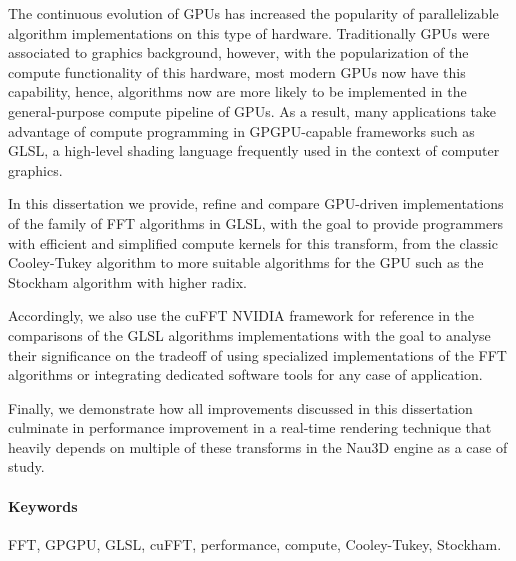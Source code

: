 \documentclass[
  oneside,
  11pt, a4paper,
  footinclude=true,
  headinclude=true,
  cleardoublepage=empty
]{scrbook}
\begin{document}
The continuous evolution of GPUs has increased the popularity of parallelizable algorithm implementations on this type of hardware. Traditionally GPUs were associated to graphics background, however, with the popularization of the compute functionality of this hardware, most modern GPUs now have this capability, hence, algorithms now are more likely to be implemented in the general-purpose compute pipeline of GPUs. As a result, many applications take advantage of compute programming in GPGPU-capable frameworks such as GLSL, a high-level shading language frequently used in the context of computer graphics.


In this dissertation we provide, refine and compare GPU-driven implementations of the family of FFT algorithms in GLSL, with the goal to provide programmers with efficient and simplified compute kernels for this transform, from the classic Cooley-Tukey algorithm to more suitable algorithms for the GPU such as the Stockham algorithm with higher radix. 

Accordingly, we also use the cuFFT NVIDIA framework for reference in the comparisons of the GLSL algorithms implementations with the goal to analyse their significance on the tradeoff of using specialized implementations of the FFT algorithms or integrating dedicated software tools for any case of application.

Finally, we demonstrate how all improvements discussed in this dissertation culminate in performance improvement in a real-time rendering technique that heavily depends on multiple of these transforms in the Nau3D engine as a case of study.



\paragraph{Keywords} FFT, GPGPU, GLSL, cuFFT, performance, compute, Cooley-Tukey, Stockham.

    \cleardoublepage

\end{document}
